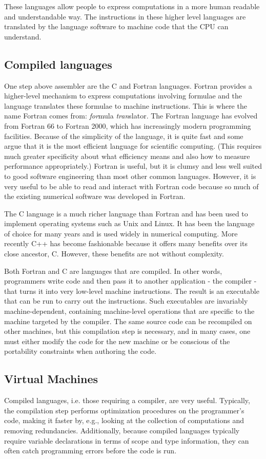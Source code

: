 These languages allow people to express computations in a more human
readable and understandable way.  The instructions in these higher
level languages are translated by the language software to machine
code that the CPU can understand.

\subsection{Compiled languages}
One step above assembler are the C and Fortran languages.  Fortran
provides a higher-level mechanism to express computations involving
formulae and the language translates these formulae to machine
instructions. This is where the name Fortran comes from:
\textit{for}mula \textit{tran}slator.  The Fortran language has
evolved from Fortran 66 to Fortran 2000, which has increasingly modern
programming facilities. Because of the simplicity of the language, it
is quite fast and some argue that it is the most efficient language
for scientific computing. (This requires much greater specificity
about what efficiency means and also how to measure performance
appropriately.)  Fortran is useful, but it is clumsy and less well
suited to good software engineering than most other common languages.
However, it is very useful to be able to read and interact with
Fortran code because so much of the existing numerical software was
developed in Fortran.

The C language is a much richer language than Fortran and has been
used to implement operating systems such as Unix and Linux.  It has
been the language of choice for many years and is used widely in
numerical computing.  More recently C++ has become fashionable because
it offers many benefits over its close ancestor, C.  However, these
benefits are not without complexity.

Both Fortran and C are languages that are compiled.  In other words,
programmers write code and then pass it to another application - the
compiler - that turns it into very low-level machine instructions.
The result is an executable that can be run to carry out the
instructions.  Such executables are invariably machine-dependent,
containing machine-level operations that are specific to the machine
targeted by the compiler.  The same source code can be recompiled on
other machines, but this compilation step is necessary, and in many
cases, one must either modify the code for the new machine or be
conscious of the portability constraints when authoring the code.


\subsection{Virtual Machines}
Compiled languages, i.e. those requiring a compiler, are very
useful. Typically, the compilation step performs optimization
procedures on the programmer's code, making it faster by, e.g.,
looking at the collection of computations and removing
redundancies. Additionally, because compiled languages typically
require variable declarations in terms of scope and type information,
they can often catch programming errors before the code is run.  

